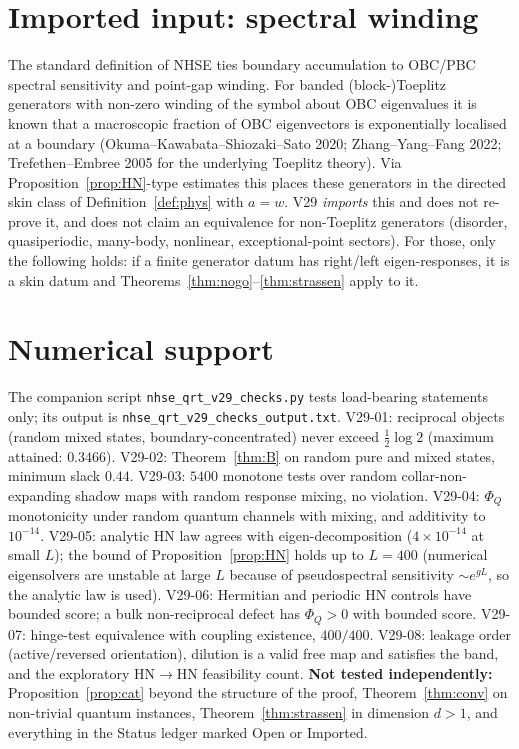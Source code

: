 \documentclass[11pt]{article}
\theoremstyle{definition}
\theoremstyle{remark}
\begin{document}
\section{Imported input: spectral winding}
\label{sec:import}

The standard definition of NHSE ties boundary accumulation to OBC/PBC spectral sensitivity and point-gap winding. For banded (block-)Toeplitz generators with non-zero winding of the symbol about OBC eigenvalues it is known that a macroscopic fraction of OBC eigenvectors is exponentially localised at a boundary (Okuma--Kawabata--Shiozaki--Sato 2020; Zhang--Yang--Fang 2022; Trefethen--Embree 2005 for the underlying Toeplitz theory). Via Proposition~\ref{prop:HN}-type estimates this places these generators in the directed skin class of Definition~\ref{def:phys} with $a=w$. V29 \emph{imports} this and does not re-prove it, and does not claim an equivalence for non-Toeplitz generators (disorder, quasiperiodic, many-body, nonlinear, exceptional-point sectors). For those, only the following holds: if a finite generator datum has right/left eigen-responses, it is a skin datum and Theorems~\ref{thm:nogo}--\ref{thm:strassen} apply to it.

\section{Numerical support}
\label{sec:num}

The companion script \texttt{nhse\_qrt\_v29\_checks.py} tests load-bearing statements only; its output is \texttt{nhse\_qrt\_v29\_checks\_output.txt}. V29-01: reciprocal objects (random mixed states, boundary-concentrated) never exceed $\tfrac12\log2$ (maximum attained: $0.3466$). V29-02: Theorem~\ref{thm:B} on random pure and mixed states, minimum slack $0.44$. V29-03: $5400$ monotone tests over random collar-non-expanding shadow maps with random response mixing, no violation. V29-04: $\Phi_Q$ monotonicity under random quantum channels with mixing, and additivity to $10^{-14}$. V29-05: analytic HN law agrees with eigen-decomposition ($4\times10^{-14}$ at small $L$); the bound of Proposition~\ref{prop:HN} holds up to $L=400$ (numerical eigensolvers are unstable at large $L$ because of pseudospectral sensitivity $\sim e^{gL}$, so the analytic law is used). V29-06: Hermitian and periodic HN controls have bounded score; a bulk non-reciprocal defect has $\Phi_Q>0$ with bounded score. V29-07: hinge-test equivalence with coupling existence, $400/400$. V29-08: leakage order (active/reversed orientation), dilution is a valid free map and satisfies the band, and the exploratory HN$\to$HN feasibility count.
\textbf{Not tested independently:} Proposition~\ref{prop:cat} beyond the structure of the proof, Theorem~\ref{thm:conv} on non-trivial quantum instances, Theorem~\ref{thm:strassen} in dimension $d>1$, and everything in the Status ledger marked Open or Imported.
\end{document}
